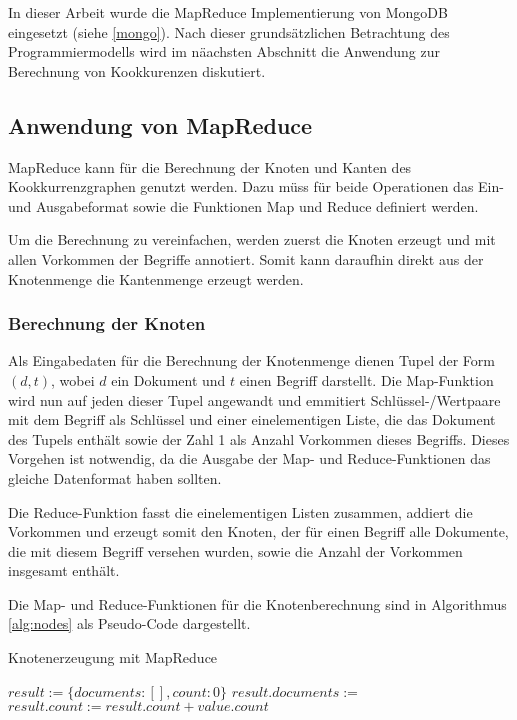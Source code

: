 In dieser Arbeit wurde die MapReduce Implementierung von MongoDB eingesetzt (siehe \ref{mongo}). Nach dieser grundsätzlichen Betrachtung des Programmiermodells wird im näachsten Abschnitt die Anwendung zur Berechnung von Kookkurenzen diskutiert.

\subsection{Anwendung von MapReduce}
\label{mapreduce_cooccurence}

MapReduce kann für die Berechnung der Knoten und Kanten des Kookkurrenzgraphen genutzt werden. Dazu müss für beide Operationen das Ein- und Ausgabeformat sowie die Funktionen Map und Reduce definiert werden.

Um die Berechnung zu vereinfachen, werden zuerst die Knoten erzeugt und mit allen Vorkommen der Begriffe annotiert. Somit kann daraufhin direkt aus der Knotenmenge die Kantenmenge erzeugt werden.

\subsubsection{Berechnung der Knoten}

Als Eingabedaten für die Berechnung der Knotenmenge dienen Tupel der Form \((d, t)\), wobei \(d\) ein Dokument und \(t\) einen Begriff darstellt. Die Map-Funktion wird nun auf jeden dieser Tupel angewandt und emmitiert Schlüssel-/Wertpaare mit dem Begriff als Schlüssel und einer einelementigen Liste, die das Dokument des Tupels enthält sowie der Zahl \num{1} als Anzahl Vorkommen dieses Begriffs. Dieses Vorgehen ist notwendig, da die Ausgabe der Map- und Reduce-Funktionen das gleiche Datenformat haben sollten.

Die Reduce-Funktion fasst die einelementigen Listen zusammen, addiert die Vorkommen und erzeugt somit den Knoten, der für einen Begriff alle Dokumente, die mit diesem Begriff versehen wurden, sowie die Anzahl der Vorkommen insgesamt enthält.

Die Map- und Reduce-Funktionen für die Knotenberechnung sind in Algorithmus \ref{alg:nodes} als Pseudo-Code dargestellt.

\begin{algorithm}
\caption{Knotenerzeugung mit MapReduce
    \label{alg:nodes}}
    \begin{algorithmic}[1]
            \State {}
        \EndFunction
        \Statex
            \State $result := \{documents: [], count: 0\}$
                \State $result.documents :=$ 
                \State $result.count := result.count + value.count$
            \EndFor
            \State {}
        \EndFunction
    \end{algorithmic}
\end{algorithm}

